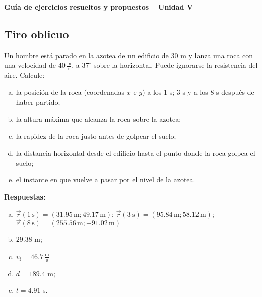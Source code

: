 \documentclass[addpoints]{exam}
\newcommand{\grado}[0]{^{\circ}}
\newcommand{\rtas}{\textbf{Respuestas: }}
\begin{document}
\renewcommand{\tablename}{Tabla}


\begin{tcolorbox}[colback=white,arc=0mm,colframe=black]
    \begin{center}
        \Large\textbf{Guía de ejercicios resueltos y propuestos -- Unidad V}
    \end{center}
\end{tcolorbox}

\vspace{11pt}

\begin{questions}

    \section{Tiro oblicuo}

    \question Un hombre está parado en la azotea de un edificio de $30$ m y lanza una roca con una velocidad de $40 \, \frac{\text{m}}{\text{s}}$, a $37\grado$ sobre la horizontal. Puede ignorarse la resistencia del aire. Calcule: 
    \begin{enumerate}[a)]
        \item la posición de la roca (coordenadas $x$ e $y$) a los $1$ s; $3$ s y a los $8$ s después de haber partido;
        \item la altura máxima que alcanza la roca sobre la azotea;
        \item la rapidez de la roca justo antes de golpear el suelo;
        \item la distancia horizontal desde el edificio hasta el punto donde la roca golpea el suelo;
        \item el instante en que vuelve a pasar por el nivel de la azotea.
    \end{enumerate}

    \rtas
    \begin{enumerate}[a)]
        \item $\vec{r} (1 \, \text{s}) = \left(31.95 \, \text{m} ; 49.17 \, \text{m} \right) $; $\vec{r} (3 \, \text{s}) = \left( 95.84 \, \text{m} ; 58.12 \, \text{m} \right) $; $\vec{r} (8 \, \text{s}) = \left( 255.56 \, \text{m} ; -91.02 \, \text{m} \right) $
        \item $29.38$ m;
        \item $v_\text{f} = 46.7 \, \frac{\text{m}}{\text{s}}$
        \item $d = 189.4$ m;
        \item $t = 4.91$ s.
    \end{enumerate}


\end{questions}
\end{document}
